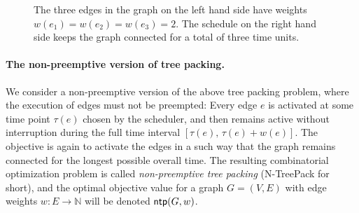 \documentclass[runningheads]{llncs}
\newcommand{\N}{\mathbb{N}}
\DeclareMathOperator{\ntp}{\text{\sf ntp}}
\newcommand{\xxxNTP}{{\sc N-TreePack}}
\begin{document}
\begin{figure}[tbh]
\bigskip
\begin{center}
\qquad\qquad\qquad

\end{center}
\caption{The three edges in the graph on the left hand side have weights $w(e_1)=w(e_2)=w(e_3)=2$.
The schedule on the right hand side keeps the graph connected for a total of three time units.}
\label{fig:example}
\end{figure}

\paragraph{The non-preemptive version of tree packing.}
We consider a non-preemptive version of the above tree packing problem,
where the execution of edges must not be preempted: 
Every edge $e$ is activated at some time point $\tau(e)$ chosen by the scheduler, and then 
remains active without interruption during the full time interval $[\tau(e),\,\tau(e)+w(e)]$.
The objective is again to activate the edges in a such way that the graph
remains connected for the longest possible overall time.
The resulting combinatorial optimization problem is called \emph{non-preemptive tree packing}
({\xxxNTP} for short), and the optimal objective value for a graph $G=(V,E)$ with edge 
weights $w:E\to\N$ will be denoted $\ntp(G,w)$.
\end{document}
